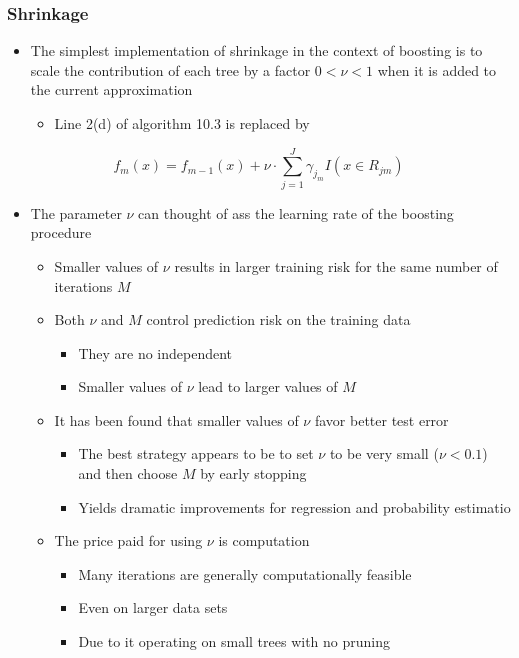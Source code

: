 \documentclass[11pt]{article}
\begin{document}
\subsubsection{Shrinkage}
\label{sec:org043ec24}
\begin{itemize}
\item The simplest implementation of shrinkage in the context of boosting is to scale the contribution of each tree by a factor \(0 < \nu < 1\) when it is added to the current approximation
\begin{itemize}
\item Line 2(d) of algorithm 10.3 is replaced by
\end{itemize}
\end{itemize}
\begin{equation}
  f_m(x) = f_{m-1}(x) + \nu \cdot \sum_{j=1}^J \gamma_{j_m} I(x \in R_{jm})
\end{equation}
\begin{itemize}
\item The parameter \(\nu\) can thought of ass the learning rate of the boosting procedure
\begin{itemize}
\item Smaller values of \(\nu\) results in larger training risk for the same number of iterations \(M\)
\item Both \(\nu\) and \(M\) control prediction risk on the training data
\begin{itemize}
\item They are no independent
\item Smaller values of \(\nu\) lead to larger values of \(M\)
\end{itemize}
\item It has been found that smaller values of \(\nu\) favor better test error
\begin{itemize}
\item The best strategy appears to be to set \(\nu\) to be very small (\(\nu < 0.1\)) and then choose \(M\) by early stopping
\item Yields dramatic improvements for regression and probability estimatio
\end{itemize}
\item The price paid for using \(\nu\) is computation
\begin{itemize}
\item Many iterations are generally computationally feasible
\item Even on larger data sets
\item Due to it operating on small trees with no pruning
\end{itemize}
\end{itemize}
\end{itemize}
\end{document}
